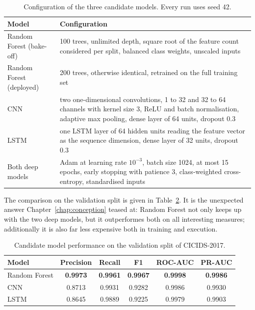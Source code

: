 \begin{table}[H]
  \centering
  \caption{Configuration of the three candidate models. Every run uses seed 42.}
  \label{tab:hyperparams}
  \renewcommand{\arraystretch}{1.3}
  \begin{tabularx}{\textwidth}{lX}
    \toprule
    \textbf{Model} & \textbf{Configuration} \\
    \midrule
    Random Forest (bake-off) & 100 trees, unlimited depth, square root of the feature count considered per split, balanced class weights, unscaled inputs \\
    Random Forest (deployed) & 200 trees, otherwise identical, retrained on the full training set \\
    CNN  & two one-dimensional convolutions, 1 to 32 and 32 to 64 channels with kernel size 3, ReLU and batch normalisation, adaptive max pooling, dense layer of 64 units, dropout 0.3 \\
    LSTM & one LSTM layer of 64 hidden units reading the feature vector as the sequence dimension, dense layer of 32 units, dropout 0.3 \\
    Both deep models & Adam at learning rate $10^{-3}$, batch size 1024, at most 15 epochs, early stopping with patience 3, class-weighted cross-entropy, standardised inputs \\
    \bottomrule
  \end{tabularx}
\end{table}

The comparison on the validation split is given in Table~\ref{tab:model_comparison}. It is the unexpected answer Chapter~\ref{chap:conception} teased at: Random Forest not only keeps up with the two deep models, but it outperformes both on all interesting measures; additionally it is also far less expensive both in training and execution.

\begin{table}[H]
  \centering
  \caption{Candidate model performance on the validation split of CICIDS-2017.}
  \label{tab:model_comparison}
  \renewcommand{\arraystretch}{1.3}
  \begin{tabularx}{\textwidth}{Xccccc}
    \toprule
    \textbf{Model} & \textbf{Precision} & \textbf{Recall} & \textbf{F1} & \textbf{ROC-AUC} & \textbf{PR-AUC} \\
    \midrule
    Random Forest & \textbf{0.9973} & \textbf{0.9961} & \textbf{0.9967} & \textbf{0.9998} & \textbf{0.9986} \\
    CNN           & 0.8713 & 0.9931 & 0.9282 & 0.9986 & 0.9930 \\
    LSTM          & 0.8645 & 0.9889 & 0.9225 & 0.9979 & 0.9903 \\
    \bottomrule
  \end{tabularx}
\end{table}


